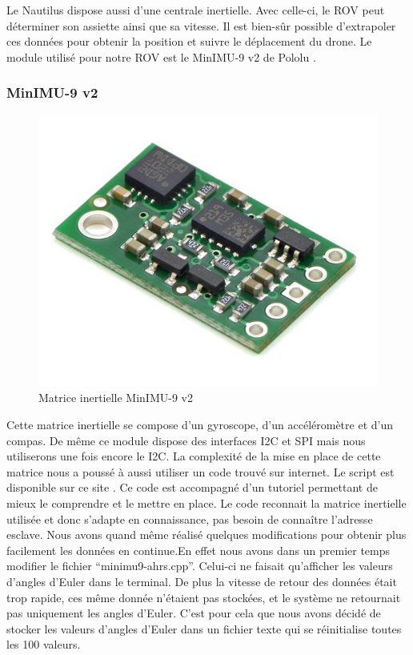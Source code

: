 \documentclass[a4paper,11pt]{report}
\begin{document}
		Le Nautilus dispose aussi d'une centrale inertielle. Avec celle-ci, le ROV peut déterminer son assiette ainsi que sa vitesse. Il est bien-sûr possible d'extrapoler ces données pour obtenir la position et suivre le déplacement du drone. Le module utilisé pour notre ROV est le MinIMU-9 v2 de Pololu \cite{ref13}.
		
			\subsubsection{MinIMU-9 v2}
			\begin{figure}[!h]
					\begin{center}
						\includegraphics[scale=0.5]{Photos/Capture31.jpg}
						\caption{Matrice inertielle MinIMU-9 v2}
					\end{center}
				\end{figure}
				Cette matrice inertielle se compose d'un gyroscope, d'un accéléromètre et d'un compas. De même ce module dispose des interfaces I2C et SPI mais nous utiliserons une fois encore le I2C. La complexité de la mise en place de cette matrice nous a poussé à aussi utiliser un code trouvé sur internet. Le script est disponible sur ce site \cite{ref14}. Ce code est accompagné d'un tutoriel permettant de mieux le comprendre et le mettre en place. Le code reconnait la matrice inertielle utilisée et donc s'adapte en connaissance, pas besoin de connaître l'adresse esclave. Nous avons quand même réalisé quelques modifications pour obtenir plus facilement les données en continue.En effet nous avons dans un premier temps modifier le fichier "`minimu9-ahrs.cpp"'. Celui-ci ne faisait qu'afficher les valeurs d'angles d’Euler dans le terminal. De plus la vitesse de retour des données était trop rapide, ces même donnée n'étaient pas stockées, et le système ne retournait pas uniquement les angles d’Euler. C'est pour cela que nous avons décidé de stocker les valeurs d'angles d’Euler dans un fichier texte qui se réinitialise toutes les 100 valeurs.
\end{document}
